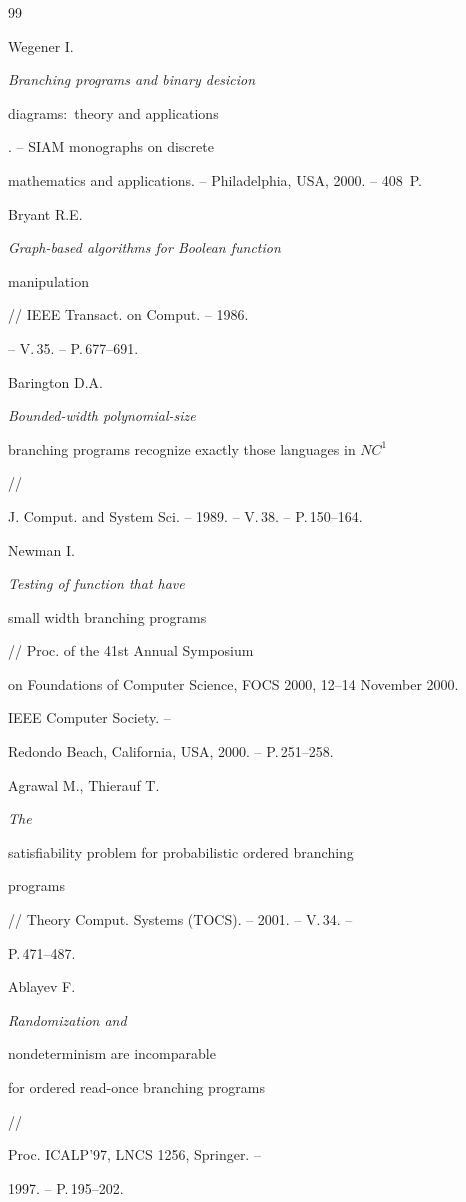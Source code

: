 \begin{thebibliography}{99}







Wegener I. {\em Branching programs and binary desicion


diagrams\/${:}$ theory and applications}. -- SIAM monographs on discrete


mathematics and applications. -- Philadelphia, USA, 2000. -- 408~P.




Bryant R.E. {\em Graph-based algorithms for Boolean function


manipulation} // IEEE Transact. on Comput. -- 1986.


-- V.\,35. -- P.\,677--691.




Barington D.A. {\em Bounded-width polynomial-size


branching programs recognize exactly those languages in $NC^1$} //


J. Comput. and System Sci. -- 1989. -- V.\,38. -- P.\,150--164.




Newman I. {\em Testing of function that have


small width branching programs} // Proc. of the 41st Annual Symposium


on Foundations of Computer Science, FOCS 2000, 12--14 November 2000.


IEEE Computer Society. --


Redondo Beach, California, USA, 2000. -- P.\,251--258.




Agrawal M., Thierauf T. {\em The


satisfiability problem for probabilistic ordered branching


programs} // Theory Comput. Systems (TOCS). -- 2001. -- V.\,34. --


P.\,471--487.




Ablayev F. {\em Randomization and


nondeterminism are incomparable


for ordered read-once branching programs} //


Proc. ICALP'97, LNCS 1256, Springer. --


1997. -- P.\,195--202.



\end{thebibliography}
